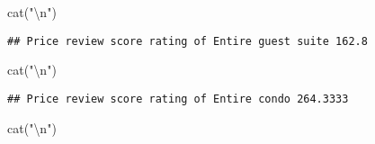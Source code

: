 \documentclass[
]{article}
\newenvironment{Shaded}{\begin{snugshade}}{\end{snugshade}}
\newcommand{\FunctionTok}[1]{\textcolor[rgb]{0.00,0.00,0.00}{#1}}
\newcommand{\NormalTok}[1]{#1}
\newcommand{\OtherTok}[1]{\textcolor[rgb]{0.56,0.35,0.01}{#1}}
\newcommand{\SpecialCharTok}[1]{\textcolor[rgb]{0.00,0.00,0.00}{#1}}
\newcommand{\StringTok}[1]{\textcolor[rgb]{0.31,0.60,0.02}{#1}}
\begin{document}
\begin{Shaded}
\begin{Highlighting}[]
\FunctionTok{cat}\NormalTok{(}\StringTok{"}\SpecialCharTok{\textbackslash{}n}\StringTok{"}\NormalTok{)}
\end{Highlighting}
\end{Shaded}

\begin{Shaded}
\end{Shaded}

\begin{verbatim}
## Price review score rating of Entire guest suite 162.8
\end{verbatim}

\begin{Shaded}
\begin{Highlighting}[]
\FunctionTok{cat}\NormalTok{(}\StringTok{"}\SpecialCharTok{\textbackslash{}n}\StringTok{"}\NormalTok{)}
\end{Highlighting}
\end{Shaded}

\begin{Shaded}
\end{Shaded}

\begin{verbatim}
## Price review score rating of Entire condo 264.3333
\end{verbatim}

\begin{Shaded}
\begin{Highlighting}[]
\FunctionTok{cat}\NormalTok{(}\StringTok{"}\SpecialCharTok{\textbackslash{}n}\StringTok{"}\NormalTok{)}
\end{Highlighting}
\end{Shaded}
\end{document}
